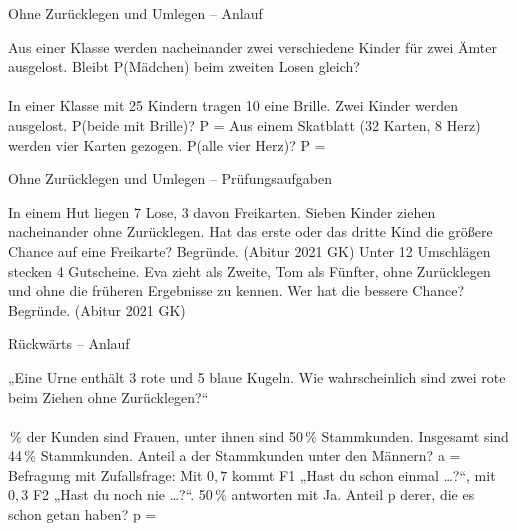 \begin{aufgabe}{Ohne Zurücklegen und Umlegen – Anlauf}
\begin{teile}
\teil Aus einer Klasse werden nacheinander zwei verschiedene Kinder für zwei Ämter ausgelost. Bleibt P(Mädchen) beim zweiten Losen gleich?\\ \\ 
\teil In einer Klasse mit 25 Kindern tragen 10 eine Brille. Zwei Kinder werden ausgelost. P(beide mit Brille)? P = \leerfeld
\teil Aus einem Skatblatt (32 Karten, 8 Herz) werden vier Karten gezogen. P(alle vier Herz)? P = \leerfeld
\end{teile}
\end{aufgabe}

\begin{aufgabe}{Ohne Zurücklegen und Umlegen – Prüfungsaufgaben}
\begin{teile}
\teil In einem Hut liegen 7 Lose, 3 davon Freikarten. Sieben Kinder ziehen nacheinander ohne Zurücklegen. Hat das erste oder das dritte Kind die größere Chance auf eine Freikarte? Begründe. \hfill (Abitur 2021 GK)
\teil Unter 12 Umschlägen stecken 4 Gutscheine. Eva zieht als Zweite, Tom als Fünfter, ohne Zurücklegen und ohne die früheren Ergebnisse zu kennen. Wer hat die bessere Chance? Begründe. \hfill (Abitur 2021 GK)
\end{teile}
\end{aufgabe}

\begin{aufgabe}{Rückwärts – Anlauf}
\begin{teile}
\teil „Eine Urne enthält 3 rote und 5 blaue Kugeln. Wie wahrscheinlich sind zwei rote beim Ziehen ohne Zurücklegen?“\\ \\ 
\,\% der Kunden sind Frauen, unter ihnen sind 50\,\% Stammkunden. Insgesamt sind 44\,\% Stammkunden. Anteil a der Stammkunden unter den Männern? a = \leerfeld
\teil Befragung mit Zufallsfrage: Mit $0{,}7$ kommt F1 „Hast du schon einmal …?“, mit $0{,}3$ F2 „Hast du noch nie …?“. 50\,\% antworten mit Ja. Anteil p derer, die es schon getan haben? p = \leerfeld
\end{teile}
\end{aufgabe}

